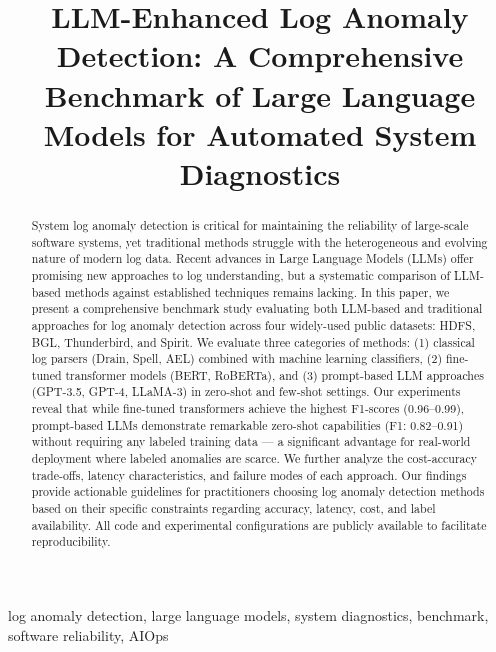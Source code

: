 \documentclass[conference]{IEEEtran}
\begin{document}
\title{LLM-Enhanced Log Anomaly Detection: A Comprehensive Benchmark of Large Language Models for Automated System Diagnostics}

\author{
}

\maketitle

\begin{abstract}
System log anomaly detection is critical for maintaining the reliability of large-scale software systems, yet traditional methods struggle with the heterogeneous and evolving nature of modern log data. Recent advances in Large Language Models (LLMs) offer promising new approaches to log understanding, but a systematic comparison of LLM-based methods against established techniques remains lacking. In this paper, we present a comprehensive benchmark study evaluating both LLM-based and traditional approaches for log anomaly detection across four widely-used public datasets: HDFS, BGL, Thunderbird, and Spirit. We evaluate three categories of methods: (1) classical log parsers (Drain, Spell, AEL) combined with machine learning classifiers, (2) fine-tuned transformer models (BERT, RoBERTa), and (3) prompt-based LLM approaches (GPT-3.5, GPT-4, LLaMA-3) in zero-shot and few-shot settings. Our experiments reveal that while fine-tuned transformers achieve the highest F1-scores (0.96--0.99), prompt-based LLMs demonstrate remarkable zero-shot capabilities (F1: 0.82--0.91) without requiring any labeled training data --- a significant advantage for real-world deployment where labeled anomalies are scarce. We further analyze the cost-accuracy trade-offs, latency characteristics, and failure modes of each approach. Our findings provide actionable guidelines for practitioners choosing log anomaly detection methods based on their specific constraints regarding accuracy, latency, cost, and label availability. All code and experimental configurations are publicly available to facilitate reproducibility.
\end{abstract}

\begin{IEEEkeywords}
log anomaly detection, large language models, system diagnostics, benchmark, software reliability, AIOps
\end{IEEEkeywords}
\end{document}
